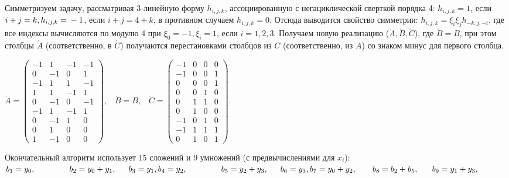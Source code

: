 \documentclass{../../template/mai_book}
\begin{document}
\newpage
\noindent
Симметризуем задачу, рассматривая 3-линейную форму $h_{i,j,k}$, ассоциированную с негациклической сверткой порядка 4: $h_{i,j,k} = 1$, если $i + j = k, h_{i,j,k} = \\ -1$, если $i + j = 4 + k$, в противном случаем $h_{i,j,k} = 0$. Отсюда выводится свойство симметрии: $h_{i,j,k} = \xi_i \xi_j h_{-k,j,-i}$, где все индексы вычисляются по модулю 4 при $\xi_0 = -1, \xi_i = 1$, если $i = 1,2,3$. Получаем новую реализацию ($\acute A,\acute B,\acute C$), где $\acute B = B$, при этом столбцы $\acute A$ (соответственно, в $\acute C$) получаются перестановками столбцов из $C$ (соответственно, из $A$) со знаком минус для первого столбца. 
\begin{center}
$\acute A = \begin{pmatrix}
-1 & 1 & -1 &-1\\
 0 & -1 & 0 &1\\         
-1 & 1 & 1 &-1\\
1 & 1 & -1 &1\\
0 & -1 & 0 &-1\\
-1 & 1 & -1 &1\\         
0 & -1 & 1 &0\\
0 & 1 & 0 &0\\
1 & -1 & 0 &0
\end{pmatrix}, \; \; \; \acute B = B, \; \; \; \acute C = \begin{pmatrix}
-1 & 0 & 0 &0\\
-1 & 0 & 0 &1\\         
0 & 0 & 0 &1\\
0 & 0 & 1 &0\\
0 & 1 & 1 &0\\
0 & 1 & 0 &0\\         
-1 & 0 & 1 &0\\
-1 & 1 & 1 &1\\
0 & 1 & 0 &1
\end{pmatrix}.$ 
\end{center}
Окончательный алгоритм использует 15 сложений и 9 умножений (с предвычислениями для $x_i$): \newline
$
b_1 = y_0, \; \; \; \; \; \; \; \; \; \; \; \; \; \; \; b_2 = y_0 + y_1, \, \: \; \; \; \; b_3 = y_1,\\
b_4 = y_2, \; \; \; \; \; \; \; \; \; \; \; \; \; \; \; b_5 = y_2 + y_3, \, \: \; \; \; \; b_6 = y_3,\\
b_7 = y_0 + y_2,  \; \; \; \; \; \; \; b_8 = b_2 + b_5,  \; \; \; \; \; \; b_9 = y_1 + y_3,
$
\newline
\end{document}
